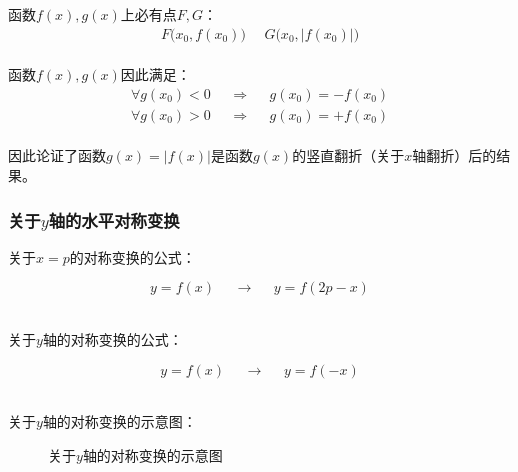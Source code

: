 \documentclass[UTF8]{ctexart}
\begin{document}
    函数$f(x),g(x)$上必有点$F,G$：
    \begin{align}
        F\big(x_0,f(x_0)\big)~~~~~~G\big(x_0,|f(x_0)|\big)
    \end{align}\\
    函数$f(x),g(x)$因此满足：
    \begin{align}
        \forall g(x_0)<0~~~~~~\Longrightarrow~~~~~~g(x_0)=-f(x_0)\\[3mm]
        \forall g(x_0)>0~~~~~~\Longrightarrow~~~~~~g(x_0)=+f(x_0)
    \end{align}\\
    因此论证了函数$g(x)=|f(x)|$是函数$g(x)$的竖直翻折（关于$x$轴翻折）后的结果。

\newpage

\subsubsection{关于$y$轴的水平对称变换}
    \setcounter{equation}{0}
    关于$x=p$的对称变换的公式：
    \begin{large}
        \begin{equation*}
            y=f(x)~~~~~~\longrightarrow~~~~~~y=f(2p-x)
        \end{equation*}
    \end{large}\\
    关于$y$轴的对称变换的公式：
    \begin{large}
        \begin{equation*}
            y=f(x)~~~~~~\longrightarrow~~~~~~y=f(-x)
        \end{equation*}
    \end{large}\\
    关于$y$轴的对称变换的示意图：
    \begin{figure}[h]
        \begin{center}
            \caption{关于$y$轴的对称变换的示意图}
        \end{center}
    \end{figure}\\
\end{document}
